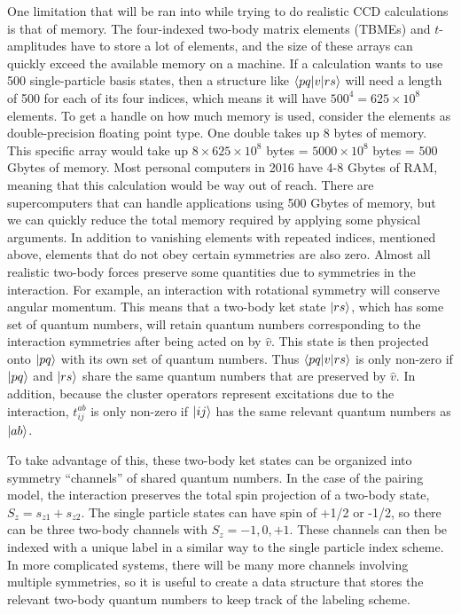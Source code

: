  One limitation that will be ran into while trying to do realistic
  CCD calculations is that of memory. The four-indexed two-body matrix elements (TBMEs) and
  $t$-amplitudes have to store a lot of elements, and the size of these
  arrays can quickly exceed the available memory on
  a machine. If a calculation wants to use 500 single-particle basis states, then
  a structure like $\braket{pq|v|rs}$ will need a  length of 500 for each of
  its four indices, which means it will have $500^4 = 625\times 10^8$
  elements. To get a handle on how much memory is used, consider the
  elements as double-precision floating point type. One double takes
  up 8 bytes of memory. This specific array would take up $8\times 625\times 10^8$ bytes
  = $5000 \times 10^8$ bytes = $500$ Gbytes of memory. Most personal
  computers in 2016 have 4-8 Gbytes of RAM, meaning that this calculation would
  be way out of reach. There are supercomputers that can handle
  applications using 500 Gbytes of memory, but we can quickly reduce
  the total memory required by applying some physical arguments. In
  addition to vanishing elements with repeated indices, mentioned
  above, elements that do not obey certain symmetries are also
  zero. Almost all realistic two-body forces preserve some quantities
  due to symmetries in the interaction. For example, an interaction
  with rotational symmetry will conserve angular momentum. This means
  that a two-body ket state $\ket{rs}$, which has some set of quantum
  numbers, will retain quantum numbers corresponding to the
  interaction symmetries after being acted on by $\hat{v}$. This state
  is then projected onto $\ket{pq}$ with its own set of quantum
  numbers. Thus $\braket{pq|v|rs}$ is only non-zero if $\ket{pq}$ and
  $\ket{rs}$ share the same quantum numbers that are preserved by
  $\hat{v}$. In addition, because the cluster operators represent
  excitations due to the interaction, $t_{ij}^{ab}$ is only non-zero
  if $\ket{ij}$ has the same relevant quantum numbers as $\ket{ab}$.

  To take advantage of this, these two-body ket states can be
  organized into symmetry ``channels'' of shared quantum numbers. In the case
  of the pairing model, the interaction preserves the total spin
  projection of a two-body state, $S_{z}=s_{z1}+s_{z2}$. The single
  particle states can have spin of +1/2 or -1/2, so there can be three
  two-body channels with $S_{z}=-1,0,+1$. These channels can then be
  indexed with a unique label in a similar way to the single particle
  index scheme. In more complicated systems, there will be many more
  channels involving multiple symmetries, so it is useful to create a
  data structure that stores the relevant two-body quantum numbers to
  keep track of the labeling scheme.


